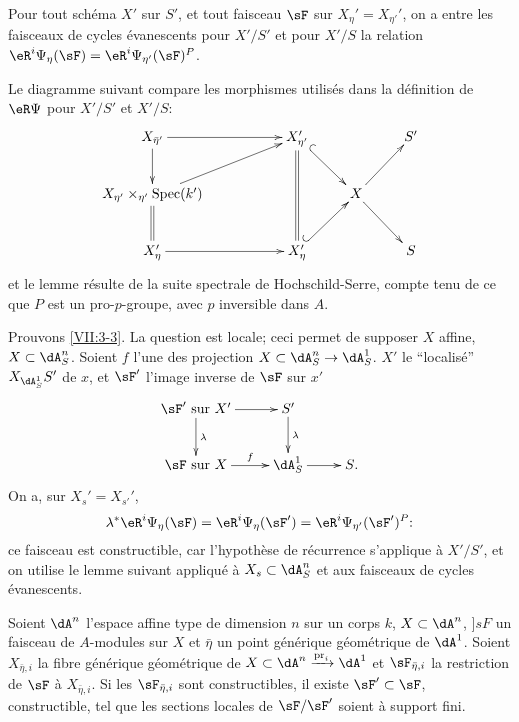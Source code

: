 \begin{lemma_}\label{VII:3-4}
Pour tout sch\'ema $X'$ sur $S'$, et tout faisceau $\sF$ sur 
$X_\eta'=X_{\eta'}'$, on a entre les faisceaux de cycles \'evanescents pour 
$X'/S'$ et pour $X'/S$ la relation 
$\eR^i \Psi_\eta(\sF) =\eR^i\Psi_{\eta'}(\sF)^P$. 
\end{lemma_}

Le diagramme suivant compare les morphismes utilis\'es dans la d\'efinition de 
$\eR\Psi$ pour $X'/S'$ et $X'/S$: 
\[\xymatrix{
  X_{\bar\eta'} \ar[rr] \ar[d] 
    & & X_{\eta'}' \ar@{=}[dd] \ar@{^{(}->}[dr] 
    & & S' \\ 
  X_{\eta'}\times_{\eta'}\spec(k') \ar@{=}[d] \ar[urr] 
    & & & X \ar[ur] \ar[dr] \\
  X_\eta' \ar[rr] 
    & & X_\eta' \ar@{^{(}->}[ur] 
    & & S
}\]
et le lemme r\'esulte de la suite spectrale de Hochschild-Serre, compte tenu de 
ce que $P$ est un pro-$p$-groupe, avec $p$ inversible dans $A$. 

Prouvons \ref{VII:3-3}. La question est locale; ceci permet de supposer $X$ 
affine, $X\subset \dA_S^n$. Soient $f$ l'une des projection 
$X\subset \dA_S^n\to \dA_S^1$. $X'$ le ``localis\'e'' $X_{\dA_S^1} S'$ de $x$, 
et $\sF'$ l'image inverse de $\sF$ sur $x'$ 
\[\xymatrix{
  \sF'\text{ sur }X' \ar[r] \ar[d]^-\lambda 
    & S' \ar[d]^-\lambda \\
  \sF \text{ sur }X \ar[r]^-f 
    & \dA_S^1 \ar[r] 
    & S \text{.} 
}\]
On a, sur $X_s'=X_{s'}'$, 
\[
  \lambda^\ast \eR^i\Psi_\eta(\sF) = \eR^i \Psi_\eta(\sF') = \eR^i\Psi_{\eta'}(\sF')^P \text{:} 
\]
ce faisceau est constructible, car l'hypoth\`ese de r\'ecurrence s'applique \`a 
$X'/S'$, et on utilise le lemme suivant appliqu\'e \`a $X_s\subset \dA_S^n$ et 
aux faisceaux de cycles \'evanescents. 





\begin{lemma_}\label{VII:3-5}
Soient $\dA^n$ l'espace affine type de dimension $n$ sur un corps $k$, 
$X\subset \dA^n$, $]sF$ un faisceau de $A$-modules sur $X$ et $\bar\eta$ un 
point g\'en\'erique g\'eom\'etrique de $\dA^1$. Soient $X_{\bar\eta,i}$ la 
fibre g\'en\'erique g\'eom\'etrique de 
$X\subset \dA^n\xrightarrow{\pr_i} \dA^1$ et $\sF_{\bar\eta,i}$ la restriction 
de $\sF$ \`a $X_{\bar\eta,i}$. Si les $\sF_{\bar\eta,i}$ sont constructibles, 
il existe $\sF'\subset \sF$, constructible, tel que les sections locales de 
$\sF/\sF'$ soient \`a support fini. 
\end{lemma_}

